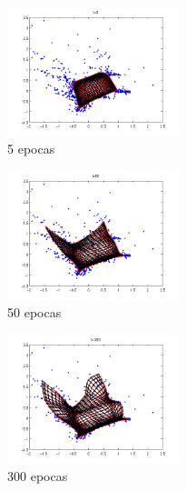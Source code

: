 \documentclass[informe.tex]{subfiles}
\begin{document}
       \FloatBarrier
	\begin{minipage}{0.31\textwidth}
	  \centering
	  \begin{figure}[H]
	    \centering
	    \includegraphics[height=3.75cm,keepaspectratio]{graficos/tiempo/5.png}
		  \caption{\small 5 epocas}
	  \end{figure}
	  
	  \begin{figure}[H]
	    \centering
	    \includegraphics[height=3.75cm,keepaspectratio]{graficos/tiempo/50.png}
		  \caption{\small 50 epocas}
	  \end{figure}
	  
	  \begin{figure}[H]
	    \centering
	    \includegraphics[height=3.75cm,keepaspectratio]{graficos/tiempo/300.png}
		  \caption{\small 300 epocas}
	  \end{figure}
	\end{minipage}
\end{document}
